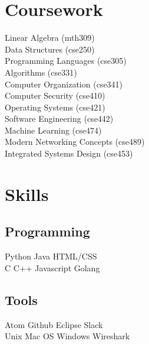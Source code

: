\documentclass[]{deedy-resume-openfont}
\begin{document}
\begin{minipage}[t]{0.33\textwidth}
\section{Coursework}
Linear Algebra (mth309) \\
Data Structures (cse250) \\
Programming Languages (cse305) \\
Algorithms (cse331) \\
Computer Organization (cse341) \\
Computer Security (cse410) \\
Operating Systems (cse421) \\
Software Engineering (cse442) \\
Machine Learning (cse474) \\
Modern Networking Concepts (cse489) \\
Integrated Systems Design (cse453) \\
\sectionsep


\section{Skills}
\subsection{Programming}
Python \textbullet{}   Java \textbullet{} HTML/CSS \\
C \textbullet{} C++ \textbullet{} Javascript \textbullet{} Golang \\
\sectionsep

\subsection{Tools}
Atom \textbullet{} Github \textbullet{} Eclipse \textbullet{} Slack \\
Unix \textbullet{} Mac OS \textbullet{} Windows \textbullet{} Wireshark \\
\sectionsep
%
%

\end{minipage} 
\hfill
\end{document}
